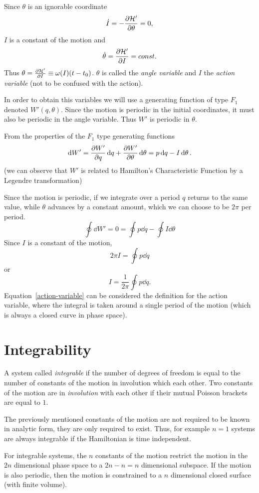 \documentclass[../thesis.tex]{subfiles}
\begin{document}
Since \(\theta \) is an ignorable coordinate
\[
  \dot{I} = -\pdv{\mathcal{H'}}{\theta} = 0,
\]
\(I\) is a constant of the motion and
\[
  \dot{\theta} = \pdv{\mathcal{H'}}{I} = const.
\]
Thus \(\theta = \pdv{\mathcal{H'}}{I} (t-t_0) \equiv \omega(I) (t-t_0)\).
\(\theta \) is called the \emph{angle variable} and \(I\) the \emph{action variable}
(not to be confused with the action).

In order to obtain this variables we will use a generating function of type \(F_1\)
denoted \(W'(q,\theta)\). Since the motion is periodic in the initial coordinates, it
must also be periodic in the angle variable. Thus \(W'\) is periodic in \(\theta \).

From the properties of the \(F_1\) type generating functions
\[
  \dd{W'} = \pdv{W'}{q} \dd{q} + \pdv{W'}{\theta} \dd{\theta} = p \dd{q} - I \dd{\theta}.
\]
(we can observe that \(W'\) is related to Hamilton's Characteristic Function by a
Legendre transformation)

Since the motion is periodic, if we integrate over a period \(q\) returns to the same
value, while \(\theta \) advances by a constant amount, which we can choose to be
\(2\pi \) per period.
\[
  \oint \dd{W'} = 0 = \oint p \dd{q} - \oint I \dd{\theta}
\]
Since \(I\) is a constant of the motion,
\[
  2\pi I = \oint p \dd{q}
\]
or
\begin{equation}
  \label{action-variable}
  I = \frac{1}{2\pi} \oint p \dd{q}.
\end{equation}
Equation~\eqref{action-variable} can be considered the definition for the
action variable, where the integral is taken around a single period of the motion
(which is always a closed curve in phase space).

\section{Integrability}

A system called \emph{integrable} if the number of degrees of freedom is equal to the number
of constants of the motion in involution which each other. Two constants of the motion
are in \emph{involution} with each other if their mutual Poisson brackets are equal to \(1\).

The previously mentioned constants of the motion are not required to be known in analytic form,
they are only required to exist. Thus, for example \(n=1\) systems are always integrable if
the Hamiltonian is time independent.

For integrable systems, the \(n\) constants of the motion restrict the motion in the
\(2n\) dimensional phase space to a \(2n-n=n\) dimensional subspace. If the motion is
also periodic, then the motion is constrained to a \(n\) dimensional closed surface
(with finite volume).
\end{document}
